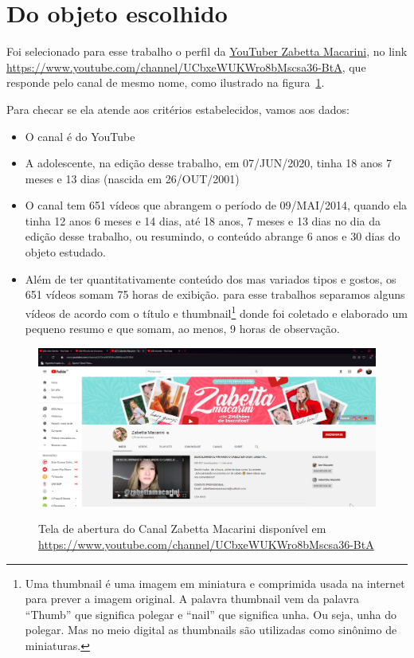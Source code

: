 \section{Do objeto escolhido}

Foi selecionado para esse trabalho o perfil da \href{https://www.youtube.com/channel/UCbxeWUKWro8bMscsa36-BtA}{YouTuber Zabetta Macarini}, no link \url{https://www.youtube.com/channel/UCbxeWUKWro8bMscsa36-BtA}, que responde pelo canal  de mesmo nome, como ilustrado na figura~\ref{fig:canal-zabetta-macarini}.

Para checar se ela atende aos critérios estabelecidos, vamos aos dados:
\begin{itemize}
    \item O canal é do YouTube
    \item A adolescente, na edição desse trabalho, em 07/JUN/2020, tinha 18 anos 7 meses e 13 dias (nascida em 26/OUT/2001)
    \item O canal tem 651 vídeos que abrangem o período de 09/MAI/2014, quando ela tinha 12 anos 6 meses e 14 dias, até 18 anos, 7 meses e 13 dias no dia da edição desse trabalho, ou resumindo, o conteúdo abrange 6 anos e 30 dias do objeto estudado.
    \item Além de ter quantitativamente conteúdo dos mas variados tipos e gostos, os 651 vídeos somam 75 horas de exibição. para esse trabalhos separamos alguns vídeos de acordo com o título e thumbnail\footnote{Uma thumbnail é uma imagem em miniatura e comprimida usada na internet para prever a imagem original. A palavra thumbnail vem da palavra “Thumb” que significa polegar e “nail” que significa unha. Ou seja, unha do polegar. Mas no meio digital as thumbnails são utilizadas como sinônimo de miniaturas.} donde foi coletado e elaborado um pequeno resumo e que somam, ao menos, 9 horas de observação.
\end{itemize}


\begin{figure}[h!]
    \centering
    \href{https://www.youtube.com/channel/UCbxeWUKWro8bMscsa36-BtA}{
        \includegraphics[width=0.999\linewidth]{fig/Canal-Zabetta-Macarini}
    }
    \caption{Tela de abertura do Canal Zabetta Macarini disponível em \url{https://www.youtube.com/channel/UCbxeWUKWro8bMscsa36-BtA}}
    \label{fig:canal-zabetta-macarini}
\end{figure}




